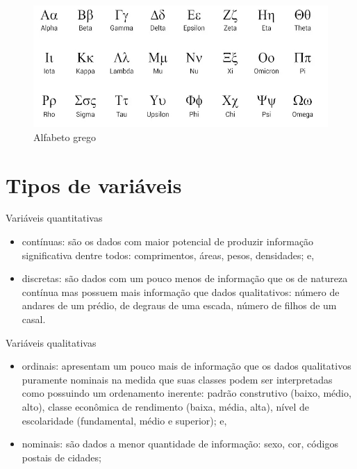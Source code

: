 \documentclass[
]{book}
\providecommand{\tightlist}{%
  \setlength{\itemsep}{0pt}\setlength{\parskip}{0pt}}
\begin{document}
\begin{figure}

{\centering \includegraphics[width=1\linewidth]{images2/alf_grego} 

}

\caption{Alfabeto grego}\label{fig:unnamed-chunk-24}
\end{figure}

\hypertarget{tipos-de-variuxe1veis}{%
\section{Tipos de variáveis}\label{tipos-de-variuxe1veis}}

Variáveis quantitativas

\begin{itemize}
\tightlist
\item
  contínuas: são os dados com maior potencial de produzir informação significativa dentre todos: comprimentos, áreas, pesos, densidades; e,
\item
  discretas: são dados com um pouco menos de informação que os de natureza contínua mas possuem mais informação que dados qualitativos: número de andares de um prédio, de degraus de uma escada, número de filhos de um casal.
\end{itemize}

Variáveis qualitativas

\begin{itemize}
\tightlist
\item
  ordinais: apresentam um pouco mais de informação que os dados qualitativos puramente nominais na medida que suas classes podem ser interpretadas como possuindo um ordenamento inerente: padrão construtivo (baixo, médio, alto), classe econômica de rendimento (baixa, média, alta), nível de escolaridade (fundamental, médio e superior); e,
\item
  nominais: são dados a menor quantidade de informação: sexo, cor, códigos postais de cidades;
\end{itemize}
\end{document}
